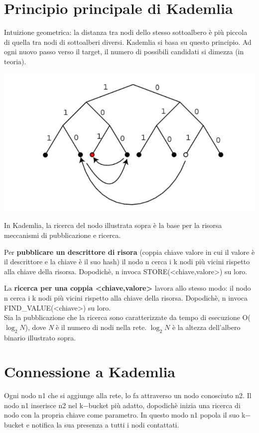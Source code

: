 \section{Principio principale di Kademlia}
Intuizione geometrica: la distanza tra nodi dello stesso sottoalbero è più piccola di quella tra nodi di sottoalberi diversi. Kademlia si basa su questo principio. Ad ogni nuovo passo verso il target, il numero di possibili candidati si dimezza (in teoria).
\begin{center}
    \includegraphics[scale = 0.4]{Images/P2P/MainPrincipleKademlia.jpg}
\end{center}
In Kademlia, la ricerca del nodo illustrata sopra è la base per la risorsa
meccanismi di pubblicazione e ricerca. 

Per \textbf{pubblicare un descrittore di risora} (coppia chiave valore in cui il valore è il descrittore e la chiave è il suo hash) il nodo n cerca i k nodi più vicini rispetto alla chiave della risorsa. Dopodichè, n invoca STORE(<chiave,valore>) su loro.

La \textbf{ricerca per una coppia <chiave,valore>} lavora allo stesso modo: il nodo n cerca i k nodi più vicini rispetto alla chiave della risorsa. Dopodichè, n invoca FIND\_VALUE(<chiave>) su loro.\\

Sia la pubblicazione che la ricerca sono caratterizzate da tempo di esecuzione O($\log_2N$), dove \emph{N} è il numero di nodi nella rete. $\log_2N$ è la altezza dell'albero binario illustrato sopra. 

\section{Connessione a Kademlia}
Ogni nodo n1 che si aggiunge alla rete, lo fa attraverso un nodo conosciuto n2. Il nodo n1 inserisce n2 nel k$-$bucket più adatto, dopodichè inizia una ricerca di nodo con la propria chiave come parametro. In questo modo n1 popola il suo k$-$bucket e notifica la sua presenza a tutti i nodi contattati. \\

